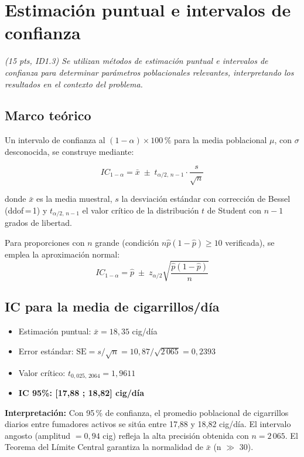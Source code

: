 \documentclass[11pt,a4paper]{article}
\newcommand{\guia}[1]{{\small\itshape\color{gris}#1}\par\vspace{0.15em}}
\begin{document}
\section{Estimación puntual e intervalos de confianza}
\label{sec:IC}

\guia{(15 pts, ID1.3) Se utilizan métodos de estimación puntual e intervalos de confianza
para determinar parámetros poblacionales relevantes, interpretando los resultados en el
contexto del problema.}

\subsection{Marco teórico}

Un intervalo de confianza al $(1-\alpha)\times 100\,\%$ para la media poblacional $\mu$,
con $\sigma$ desconocida, se construye mediante:

\begin{equation}
IC_{1-\alpha} = \bar{x} \;\pm\; t_{\alpha/2,\, n-1} \cdot \frac{s}{\sqrt{n}}
\label{eq:IC_t}
\end{equation}

donde $\bar{x}$ es la media muestral, $s$ la desviación estándar con corrección de Bessel
(ddof\,=\,1) y $t_{\alpha/2,\,n-1}$ el valor crítico de la distribución $t$ de Student
con $n-1$ grados de libertad.

Para proporciones con $n$ grande (condición $n\hat{p}(1-\hat{p}) \geq 10$ verificada),
se emplea la aproximación normal:
\begin{equation}
IC_{1-\alpha} = \hat{p} \;\pm\; z_{\alpha/2} \sqrt{\frac{\hat{p}(1-\hat{p})}{n}}
\label{eq:IC_Z}
\end{equation}

\subsection{IC para la media de cigarrillos/día}

\begin{resultbox}
\begin{itemize}[noitemsep]
  \item Estimación puntual: $\bar{x} = 18{,}35$ cig/día
  \item Error estándar: $\text{SE} = s/\sqrt{n} = 10{,}87/\sqrt{2\,065} = 0{,}2393$
  \item Valor crítico: $t_{0{,}025,\,2064} = 1{,}9611$
  \item \textbf{IC 95\%: [17{,}88 ; 18{,}82] cig/día}
\end{itemize}
\textbf{Interpretación:} Con 95\,\% de confianza, el promedio poblacional de
cigarrillos diarios entre fumadores activos se sitúa entre 17{,}88 y 18{,}82 cig/día.
El intervalo angosto (amplitud $= 0{,}94$ cig) refleja la alta precisión obtenida con
$n=2\,065$. El Teorema del Límite Central garantiza la normalidad de $\bar{x}$ (n $\gg$ 30).
\end{resultbox}
\end{document}
